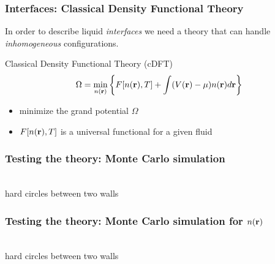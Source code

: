 \begin{frame}
  \frametitle{Interfaces:  Classical Density Functional Theory}
  In order to describe liquid \emph{interfaces} we need a theory that
  can handle \emph{inhomogeneous} configurations.
  \begin{block}{Classical Density Functional Theory (cDFT)}
    \[\Omega = \min_{n(\mathbf{r})} \left\{ F[n(\mathbf{r}), T] + \int (V(\mathbf{r})-\mu) n(\mathbf{r})d\mathbf{r} \right\}
    \]
    \begin{itemize}
    \item minimize the grand potential $\Omega$
    \item $F[n(\mathbf{r}),T]$ is a universal functional for a given fluid
    \end{itemize}
  \end{block}
\end{frame}

\begin{frame}
  \frametitle{Testing the theory:  Monte Carlo simulation}
  \vspace{-0.8em}
  \begin{center}
    \\
    \vspace{-2.0em}
    hard circles between two walls
  \end{center}
\end{frame}

\begin{frame}
  \frametitle{Testing the theory:  Monte Carlo simulation for $n(\mathbf{r})$}
  \vspace{-0.8em}
  \begin{center}
    \\
    \vspace{-2.0em}
    hard circles between two walls
  \end{center}
\end{frame}

